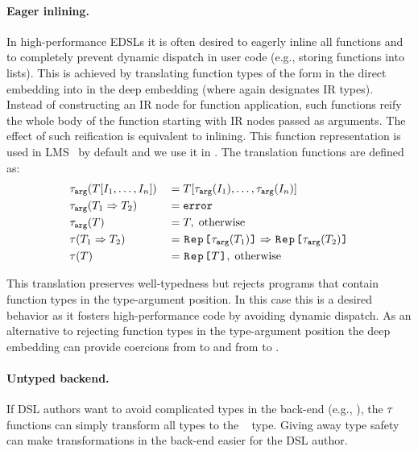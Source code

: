 \paragraph{Eager inlining.} In high-performance EDSLs it is often desired to
eagerly inline all functions and to completely prevent dynamic dispatch in
user code (e.g., storing functions into lists).  This is achieved by translating
function types of the form  in the direct embedding into
 in the deep embedding (where  again
designates IR types). Instead of constructing an IR node for function application, such functions reify the
whole body of the function starting with IR nodes passed as arguments. The effect of such
reification is equivalent to inlining. This function representation is used in LMS~\cite{rompf_lightweight_2012} by default
and we use it in . The translation functions are defined as:
\renewcommand*{\mathellipsis}{%
  \mathinner{{\ldotp}{\ldotp}{\ldotp}}%
}
\begin{alignat*}{3}
&\ttarg[T\lbrack I_1,\ldots,I_n \rbrack]   & \; = \; & T[\ttarg[I_1],\ldots,\ttarg[I_n]] \\
&\ttarg[T_1 \Rightarrow T_2] & \; = \; & \mathtt{error} \\
&\ttarg[T] & \; = \; & T, \; \text{otherwise} \\ %
&\ttother[T_1 \Rightarrow T_2] & \; = \; & \text{\code{Rep[}}\ttarg[T_1]\text{\code{]}} \Rightarrow \text{\code{Rep[}}\ttarg[T_2]\text{\code{]}}\\
&\ttother[T] & \; = \; & \text{\code{Rep[}} T \text{\code{]}},
\; \text{otherwise}
\end{alignat*} %

This translation preserves well-typedness but rejects programs that contain
function types in the type-argument position. In this case this is a desired
behavior as it fosters high-performance code by avoiding dynamic dispatch. As an alternative to rejecting function types in the type-argument position the deep embedding can provide
coercions from  to  and from  to .

\paragraph{Untyped backend.} If DSL authors want to avoid complicated types in the back-end (e.g., ), the $\tau$ functions can simply transform all types to the ~\cite{abadi_dynamic_1991} type. Giving away type safety can make transformations in the back-end easier for the DSL author.


